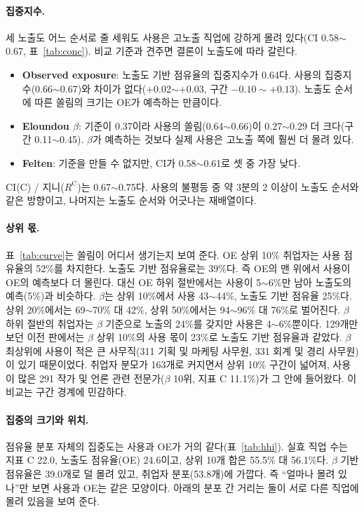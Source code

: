 \documentclass[11pt]{article}
\begin{document}
\paragraph{집중지수.} 세 노출도 어느 순서로 줄 세워도 사용은 고노출 직업에 강하게 몰려 있다(CI 0.58$\sim$0.67, 표~\ref{tab:conc}). 비교 기준과 견주면 결론이 노출도에 따라 갈린다.
\begin{itemize}[leftmargin=*]
  \item \textbf{Observed exposure}: 노출도 기반 점유율의 집중지수가 0.64다. 사용의 집중지수(0.66$\sim$0.67)와 차이가 없다(+0.02$\sim$+0.03, 구간 $-0.10\sim+0.13$). 노출도 순서에 따른 쏠림의 크기는 OE가 예측하는 만큼이다.
  \item \textbf{Eloundou $\beta$}: 기준이 0.37이라 사용의 쏠림(0.64$\sim$0.66)이 0.27$\sim$0.29 더 크다(구간 0.11$\sim$0.45). $\beta$가 예측하는 것보다 실제 사용은 고노출 쪽에 훨씬 더 몰려 있다.
  \item \textbf{Felten}: 기준을 만들 수 없지만, CI가 0.58$\sim$0.61로 셋 중 가장 낮다.
\end{itemize}
CI(C) / 지니($R^{\mathrm{C}}$)는 0.67$\sim$0.75다. 사용의 불평등 중 약 3분의 2 이상이 노출도 순서와 같은 방향이고, 나머지는 노출도 순서와 어긋나는 재배열이다.

\paragraph{상위 몫.} 표~\ref{tab:curve}는 쏠림이 어디서 생기는지 보여 준다. OE 상위 10\% 취업자는 사용 점유율의 52\%를 차지한다. 노출도 기반 점유율로는 39\%다. 즉 OE의 맨 위에서 사용이 OE의 예측보다 더 몰린다. 대신 OE 하위 절반에서는 사용이 5$\sim$6\%만 남아 노출도의 예측(5\%)과 비슷하다. $\beta$는 상위 10\%에서 사용 43$\sim$44\%, 노출도 기반 점유율 25\%다. 상위 20\%에서는 69$\sim$70\% 대 42\%, 상위 50\%에서는 94$\sim$96\% 대 76\%로 벌어진다. $\beta$ 하위 절반의 취업자는 $\beta$ 기준으로 노출의 24\%를 갖지만 사용은 4$\sim$6\%뿐이다. 129개만 보던 이전 판에서는 $\beta$ 상위 10\%의 사용 몫이 23\%로 노출도 기반 점유율과 같았다. $\beta$ 최상위에 사용이 적은 큰 사무직(311 기획 및 마케팅 사무원, 331 회계 및 경리 사무원)이 있기 때문이었다. 취업자 분모가 163개로 커지면서 상위 10\% 구간이 넓어져, 사용이 많은 291 작가 및 언론 관련 전문가($\beta$ 10위, 지표 C 11.1\%)가 그 안에 들어왔다. 이 비교는 구간 경계에 민감하다.

\paragraph{집중의 크기와 위치.} 점유율 분포 자체의 집중도는 사용과 OE가 거의 같다(표~\ref{tab:hhi}). 실효 직업 수는 지표 C 22.0, 노출도 점유율(OE) 24.6이고, 상위 10개 합은 55.5\% 대 56.1\%다. $\beta$ 기반 점유율은 39.0개로 덜 몰려 있고, 취업자 분포(53.8개)에 가깝다. 즉 ``얼마나 몰려 있나''만 보면 사용과 OE는 같은 모양이다. 아래의 분포 간 거리는 둘이 서로 다른 직업에 몰려 있음을 보여 준다.
\end{document}

